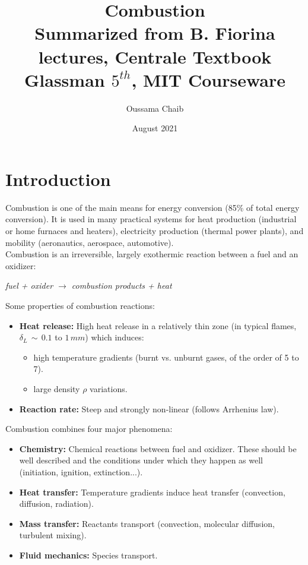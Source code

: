 \documentclass[a4paper,11pt]{article}
\title{%
Combustion \\
\vspace{10pt}
\small Summarized from B. Fiorina lectures, Centrale Textbook \\
Glassman $5^{th}$, MIT Courseware}
\author{\small Oussama Chaib}
\date{\small August 2021}
\begin{document}
\maketitle
\tableofcontents
\pagebreak
\section{Introduction}

Combustion is one of the main means for energy conversion (85\% of total energy conversion). It is used in many practical systems for heat production (industrial or home furnaces and heaters), electricity production (thermal power plants), and mobility (aeronautics, aerospace, automotive).\\
Combustion is an irreversible, largely exothermic reaction between a fuel and an oxidizer:
\begin{center}
\emph{fuel + oxider $\rightarrow$ combustion products + heat}
\end{center}
Some properties of combustion reactions:
\begin{itemize}
    \item \textbf{Heat release:} High heat release in a relatively thin zone (in typical flames, $\delta _L\,\sim\,0.1$ to $1\,mm$) which induces:
    \begin{itemize}
        \item high temperature gradients (burnt vs. unburnt gases, of the order of 5 to 7).
        \item large density $\rho$ variations.
    \end{itemize}
    \item \textbf{Reaction rate:} Steep and strongly non-linear (follows Arrhenius law).
\end{itemize}
Combustion combines four major phenomena:
\begin{itemize}
    \item \textbf{Chemistry:} Chemical reactions between fuel and oxidizer. These should be well described and the conditions under which they happen as well (initiation, ignition, extinction...).
    \item \textbf{Heat transfer:} Temperature gradients induce heat transfer (convection, diffusion, radiation).
    \item \textbf{Mass transfer:} Reactants transport (convection, molecular diffusion, turbulent mixing).
    \item \textbf{Fluid mechanics:} Species transport.
\end{itemize}
\end{document}
